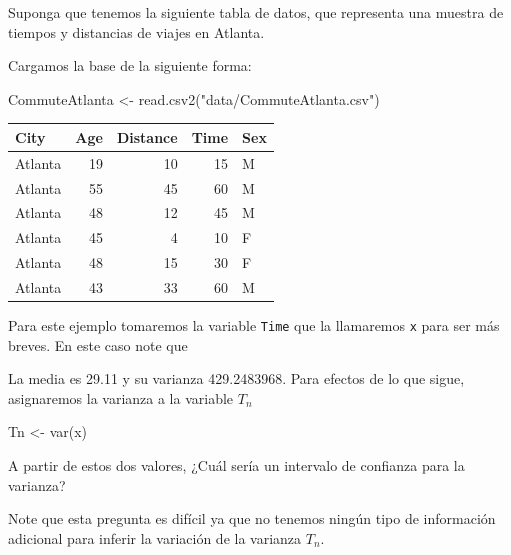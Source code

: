\documentclass[
  12pt,
]{book}
\newenvironment{Shaded}{\begin{snugshade}}{\end{snugshade}}
\newcommand{\FunctionTok}[1]{\textcolor[rgb]{0.00,0.00,0.00}{#1}}
\newcommand{\NormalTok}[1]{#1}
\newcommand{\OtherTok}[1]{\textcolor[rgb]{0.56,0.35,0.01}{#1}}
\newcommand{\SpecialCharTok}[1]{\textcolor[rgb]{0.00,0.00,0.00}{#1}}
\newcommand{\StringTok}[1]{\textcolor[rgb]{0.31,0.60,0.02}{#1}}
\theoremstyle{definition}
\theoremstyle{definition}
\theoremstyle{definition}
\theoremstyle{definition}
\theoremstyle{remark}
\begin{document}
Suponga que tenemos la siguiente tabla de datos, que representa una
muestra de tiempos y distancias de viajes en Atlanta.

Cargamos la base de la siguiente forma:

\begin{Shaded}
\begin{Highlighting}[]
\NormalTok{CommuteAtlanta }\OtherTok{\textless{}{-}} \FunctionTok{read.csv2}\NormalTok{(}\StringTok{"data/CommuteAtlanta.csv"}\NormalTok{)}
\end{Highlighting}
\end{Shaded}

\begin{tabular}{l|r|r|r|l}
\hline
City & Age & Distance & Time & Sex\\
\hline
Atlanta & 19 & 10 & 15 & M\\
\hline
Atlanta & 55 & 45 & 60 & M\\
\hline
Atlanta & 48 & 12 & 45 & M\\
\hline
Atlanta & 45 & 4 & 10 & F\\
\hline
Atlanta & 48 & 15 & 30 & F\\
\hline
Atlanta & 43 & 33 & 60 & M\\
\hline
\end{tabular}

Para este ejemplo tomaremos la variable \texttt{Time} que la
llamaremos \texttt{x} para ser más breves. En este caso note que

\begin{Shaded}
\end{Shaded}

La media es 29.11 y su varianza 429.2483968. Para efectos de lo que sigue, asignaremos la varianza a la variable \(T_n\)

\begin{Shaded}
\begin{Highlighting}[]
\NormalTok{Tn }\OtherTok{\textless{}{-}} \FunctionTok{var}\NormalTok{(x)}
\end{Highlighting}
\end{Shaded}

A partir de estos dos valores, ¿Cuál sería un intervalo de confianza
para la varianza?

Note que esta pregunta es difícil ya que no tenemos ningún tipo de
información adicional para inferir la variación de la varianza \(T_n\).
\end{document}
